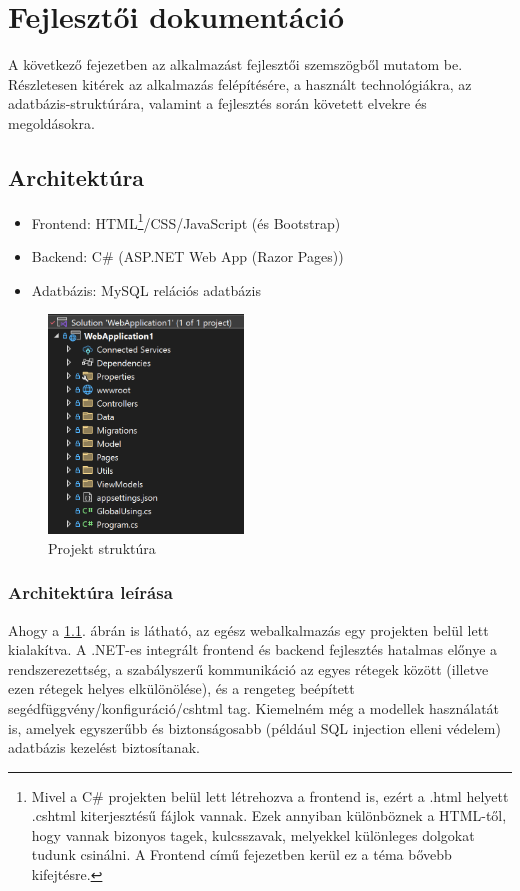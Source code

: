 \chapter{Fejlesztői dokumentáció}
\label{ch:impl}
 A következő fejezetben az alkalmazást fejlesztői szemszögből mutatom be. Részletesen kitérek az alkalmazás felépítésére, a használt technológiákra, az adatbázis-struktúrára, valamint a fejlesztés során követett elvekre és megoldásokra.

\section{Architektúra}
\begin{itemize}
	\item Frontend: HTML\footnote{Mivel a C\# projekten
		belül lett létrehozva a frontend is, ezért a .html helyett .cshtml
		kiterjesztésű fájlok vannak. Ezek annyiban különböznek a 
		HTML-től, hogy vannak bizonyos tagek, kulcsszavak, melyekkel
		különleges dolgokat tudunk csinálni. A Frontend című fejezetben kerül ez a téma bővebb kifejtésre.}/CSS/JavaScript (és Bootstrap)
	\item Backend: C\# (ASP.NET Web App (Razor Pages))
	\item Adatbázis: MySQL relációs adatbázis
\end{itemize}

\begin{figure}[H]
	\centering
	\includegraphics[height=220px]{img/solution-explorer-screenshot}
	\caption{Projekt struktúra}
	\label{fig:project-structure}
\end{figure}

\subsection{Architektúra leírása}
Ahogy a \ref{fig:project-structure}. ábrán is látható, az egész webalkalmazás egy projekten belül lett kialakítva. A .NET-es integrált frontend és backend fejlesztés hatalmas előnye a rendszerezettség, a szabályszerű kommunikáció az egyes rétegek között (illetve ezen rétegek helyes elkülönölése), és a rengeteg beépített segédfüggvény/konfiguráció/cshtml tag. Kiemelném még a modellek használatát is, amelyek egyszerűbb és biztonságosabb (például SQL injection elleni védelem) adatbázis kezelést biztosítanak.

